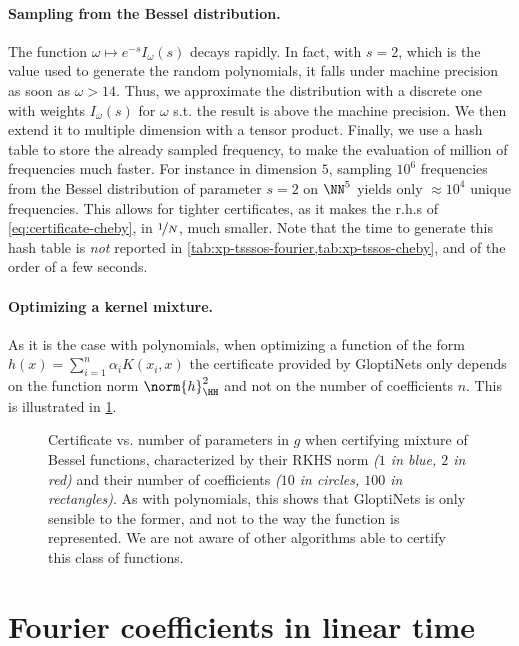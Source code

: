 \documentclass{article}
\begin{document}
\paragraph{Sampling from the Bessel distribution.}
The function $\omega \mapsto e^{-s} I_{\omega}(s)$ decays rapidly. In fact, with $s = 2$, which is the value used to generate the random polynomials, it falls under machine precision as soon as $\omega > 14$. Thus, we approximate the distribution with a discrete one with weights $I_\omega(s)$ for $\omega$ s.t. the result is above the machine precision. We then extend it to multiple dimension with a tensor product. Finally, we use a hash table to store the already sampled frequency, to make the evaluation of million of frequencies much faster. For instance in dimension $5$, sampling $10^6$ frequencies from the Bessel distribution of parameter $s = 2$ on $\NN^5$ yields only $\approx 10^4$ unique frequencies. This allows for tighter certificates, as it makes the r.h.s of \cref{eq:certificate-cheby}, in $\nicefrac{1}{N}$, much smaller. Note that the time to generate this hash table is \emph{not} reported in \cref{tab:xp-tsssos-fourier,tab:xp-tssos-cheby}, and of the order of a few seconds.

\paragraph{Optimizing a kernel mixture.}
As it is the case with polynomials, when optimizing a function of the form $h(x) = \sum_{i=1}^n \alpha_i K(x_i, x)$ the certificate provided by GloptiNets only depends on the function norm $\norm{h}_\HH^2$ and not on \eg the number of coefficients $n$. This is illustrated in \cref{fig:xp-params-kernel}.

\begin{figure}
  \centering
  
  \caption{Certificate vs. number of parameters in $g$ when certifying mixture of Bessel functions, characterized by their RKHS norm \emph{($1$ in blue, $2$ in red)} and their number of coefficients \emph{($10$ in circles, $100$ in rectangles)}. As with polynomials, this shows that GloptiNets is only sensible to the former, and not to the way the function is represented. We are not aware of other algorithms able to certify this class of functions.}
  \label{fig:xp-params-kernel}
\end{figure}

\section{Fourier coefficients in linear time}
\label{sec:fourier-coeff-linear-time}
\end{document}
